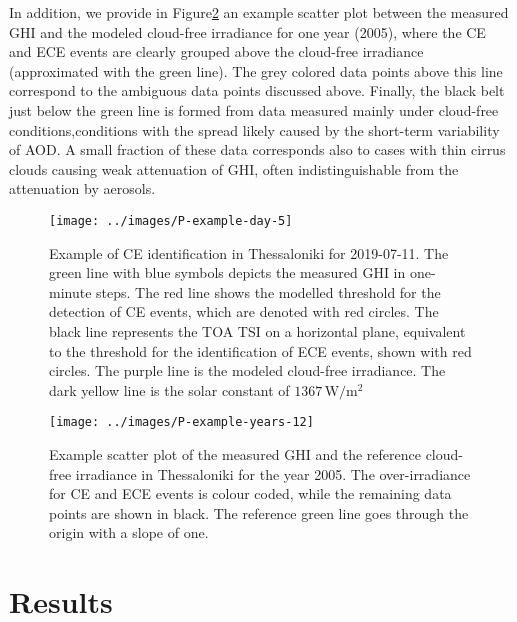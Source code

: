 \documentclass[preprint, 5p,
authoryear]{elsarticle} %
\begin{document}
In addition, we provide in Figure\nobreakspace{}\ref{fig:example-year}
an example scatter plot between the measured GHI and the modeled
cloud-free irradiance for one year (2005), where the CE and ECE events
are clearly grouped above the cloud-free irradiance (approximated with
the green line). The grey colored data points above this line correspond
to the ambiguous data points discussed above. Finally, the black belt
just below the green line is formed from data measured mainly under
cloud-free conditions,conditions with the spread likely caused by the
short-term variability of AOD. A small fraction of these data
corresponds also to cases with thin cirrus clouds causing weak
attenuation of GHI, often indistinguishable from the attenuation by
aerosols.

\begin{figure}[H]

{\centering \texttt{[image: ../images/P-example-day-5]} 

}

\caption{Example of CE identification in Thessaloniki for 2019-07-11. The green line with blue symbols depicts the measured GHI in one-minute steps. The red line shows the modelled threshold for the detection of CE events, which are denoted with red circles. The black line represents the TOA TSI on a horizontal plane, equivalent to the threshold for the identification of ECE events, shown with red circles. The purple line is the modeled cloud-free irradiance. The dark yellow line is the solar constant of $1367\,\text{W}/\text{m}^{2}$}\label{fig:example-day}
\end{figure}

\begin{figure}[H]

{\centering \texttt{[image: ../images/P-example-years-12]} 

}

\caption{Example scatter plot of the measured GHI and the reference cloud-free irradiance in Thessaloniki for the year 2005. The over-irradiance for CE and ECE events is colour coded, while the remaining data points are shown in black. The reference green line goes through the origin with a slope of one.}\label{fig:example-year}
\end{figure}

\hypertarget{results}{%
\section{Results}\label{results}}
\end{document}
